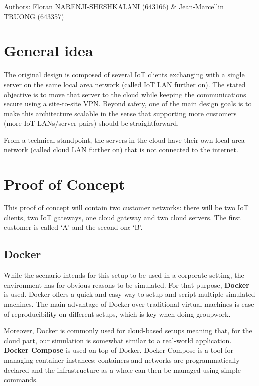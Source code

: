 \documentclass[paper=a4, fontsize=11pt]{scrartcl}
\author{Floran NARENJI-SHESHKALANI \& Jean-Marcellin TRUONG}
\begin{document}
Authors: Floran NARENJI-SHESHKALANI (643166) \& Jean-Marcellin TRUONG (643357)

\tableofcontents

\section{General idea}

The original design is composed of several IoT clients exchanging with a single
server on the same local area network (called IoT LAN further on).
The stated objective is to move that server to the cloud while keeping the
communications secure using a site-to-site VPN\@.
Beyond safety, one of the main design goals is to make this architecture
scalable in the sense that supporting more customers (more IoT LANs/server
pairs) should be straightforward.

From a technical standpoint, the servers in the cloud have their own local area
network (called cloud LAN further on) that is not connected to the internet.

\section{Proof of Concept}

This proof of concept will contain two customer networks: there will be two IoT
clients, two IoT gateways, one cloud gateway and two cloud servers.
The first customer is called `A' and the second one `B'.

\subsection{Docker}

While the scenario intends for this setup to be used in a corporate setting, the
environment has for obvious reasons to be simulated.
For that purpose, \textbf{Docker} is used. Docker offers a quick and easy way to
setup and script multiple simulated machines.
The main advantage of Docker over traditional virtual machines is ease of
reproducibility on different setups, which is key when doing groupwork.

Moreover, Docker is commonly used for cloud-based setups meaning that, for the
cloud part, our simulation is somewhat similar to a real-world application.
\\

\textbf{Docker Compose} is used on top of Docker. Docker Compose is a tool for
managing container instances: containers and networks are programmatically
declared and the infrastructure as a whole can then be managed using simple
commands.
\end{document}

